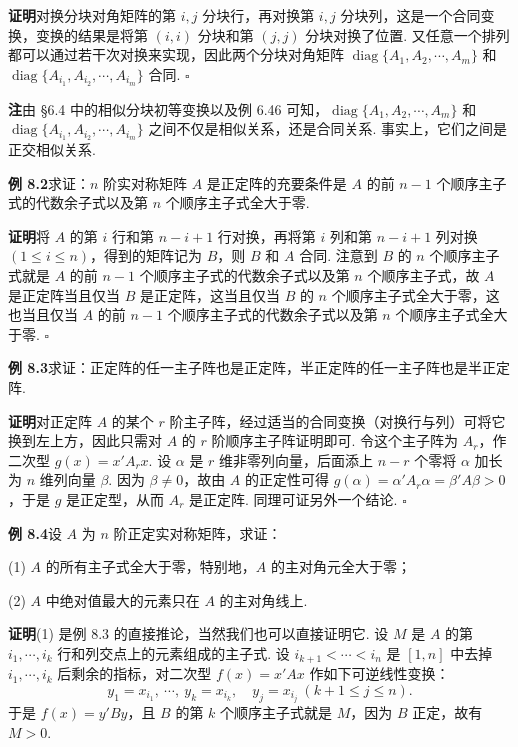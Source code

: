 \documentclass[UTF8, 12pt, fontset=fandol, oneside]{ctexart}
\begin{document}
\noindent\textbf{证明}\quad 对换分块对角矩阵的第 $i,j$ 分块行，再对换第 $i,j$ 分块列，这是一个合同变换，变换的结果是将第 $(i,i)$ 分块和第 $(j,j)$ 分块对换了位置. 又任意一个排列都可以通过若干次对换来实现，因此两个分块对角矩阵 $\operatorname{diag}\{A_1,A_2,\cdots,A_m\}$ 和 $\operatorname{diag}\{A_{i_1},A_{i_2},\cdots,A_{i_m}\}$ 合同. $\ensuremath{\square}$

\noindent\textbf{注}\quad 由 §6.4 中的相似分块初等变换以及例 6.46 可知，$\operatorname{diag}\{A_1,A_2,\cdots,A_m\}$ 和 $\operatorname{diag}\{A_{i_1},A_{i_2},\cdots,A_{i_m}\}$ 之间不仅是相似关系，还是合同关系. 事实上，它们之间是正交相似关系.

\noindent\textbf{例 8.2}\quad 求证：$n$ 阶实对称矩阵 $A$ 是正定阵的充要条件是 $A$ 的前 $n-1$ 个顺序主子式的代数余子式以及第 $n$ 个顺序主子式全大于零.

\noindent\textbf{证明}\quad 将 $A$ 的第 $i$ 行和第 $n-i+1$ 行对换，再将第 $i$ 列和第 $n-i+1$ 列对换 $(1\le i\le n)$，得到的矩阵记为 $B$，则 $B$ 和 $A$ 合同. 注意到 $B$ 的 $n$ 个顺序主子式就是 $A$ 的前 $n-1$ 个顺序主子式的代数余子式以及第 $n$ 个顺序主子式，故 $A$ 是正定阵当且仅当 $B$ 是正定阵，这当且仅当 $B$ 的 $n$ 个顺序主子式全大于零，这也当且仅当 $A$ 的前 $n-1$ 个顺序主子式的代数余子式以及第 $n$ 个顺序主子式全大于零. $\ensuremath{\square}$

\noindent\textbf{例 8.3}\quad 求证：正定阵的任一主子阵也是正定阵，半正定阵的任一主子阵也是半正定阵.

\noindent\textbf{证明}\quad 对正定阵 $A$ 的某个 $r$ 阶主子阵，经过适当的合同变换（对换行与列）可将它换到左上方，因此只需对 $A$ 的 $r$ 阶顺序主子阵证明即可. 令这个主子阵为 $A_r$，作二次型 $g(x)=x'A_rx$. 设 $\alpha$ 是 $r$ 维非零列向量，后面添上 $n-r$ 个零将 $\alpha$ 加长为 $n$ 维列向量 $\beta$. 因为 $\beta\ne 0$，故由 $A$ 的正定性可得 $g(\alpha)=\alpha'A_r\alpha=\beta'A\beta>0$，于是 $g$ 是正定型，从而 $A_r$ 是正定阵. 同理可证另外一个结论. $\ensuremath{\square}$

\noindent\textbf{例 8.4}\quad 设 $A$ 为 $n$ 阶正定实对称矩阵，求证：

(1) $A$ 的所有主子式全大于零，特别地，$A$ 的主对角元全大于零；

(2) $A$ 中绝对值最大的元素只在 $A$ 的主对角线上.

\noindent\textbf{证明}\quad (1) 是例 8.3 的直接推论，当然我们也可以直接证明它. 设 $M$ 是 $A$ 的第 $i_1,\cdots,i_k$ 行和列交点上的元素组成的主子式. 设 $i_{k+1}<\cdots<i_n$ 是 $[1,n]$ 中去掉 $i_1,\cdots,i_k$ 后剩余的指标，对二次型 $f(x)=x'Ax$ 作如下可逆线性变换：
\[
y_1=x_{i_1},\ \cdots,\ y_k=x_{i_k},\quad y_j=x_{i_j}\ (k+1\le j\le n).
\]
于是 $f(x)=y'By$，且 $B$ 的第 $k$ 个顺序主子式就是 $M$，因为 $B$ 正定，故有 $M>0$.
\end{document}
